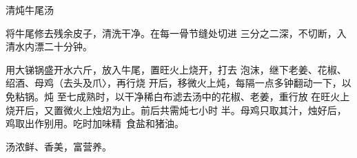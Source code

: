 \begin{recipe}{清炖牛尾汤}

\ingredients



\cooking

将牛尾修去残余皮子，清洗干净。在每一骨节缝处切进 三分之二深，不切断，入清水内漂二十分钟。

用大锑锅盛开水六斤，放入牛尾，置旺火上烧开，打去 泡沫，继下老姜、花椒、绍酒、母鸡（去头及爪〉，再行烧 开后，移微火上炖，每隔一点多钟翻动一下，以免粘锅。炖 至七成熟时，以干净稀白布滤去汤中的花椒、老姜，重行放 在旺火上烧开后，又置微火上烛炤为止。前后共需炖七小时 半。母鸡只取其汁，烛好后，鸡取出作别用。吃时加味精\ 食盐和猪油。

\notes

汤浓鲜、香美，富营养。

\end{recipe}

